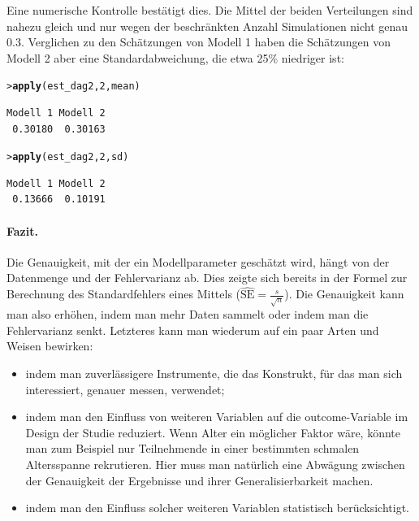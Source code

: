 \documentclass[oneside, 10pt]{book}\usepackage[]{graphicx}\usepackage[]{xcolor}
\makeatletter
\newcommand{\hlnum}[1]{\textcolor[rgb]{0.686,0.059,0.569}{#1}}%
\newcommand{\hlstd}[1]{\textcolor[rgb]{0.345,0.345,0.345}{#1}}%
\newcommand{\hlkwd}[1]{\textcolor[rgb]{0.737,0.353,0.396}{\textbf{#1}}}%
\newenvironment{kframe}{%
 \def\at@end@of@kframe{}%
 \ifinner\ifhmode%
  \def\at@end@of@kframe{\end{minipage}}%
  \begin{minipage}{\columnwidth}%
 \fi\fi%
 \def\FrameCommand##1{\hskip\@totalleftmargin \hskip-\fboxsep
 \colorbox{shadecolor}{##1}\hskip-\fboxsep
     \hskip-\linewidth \hskip-\@totalleftmargin \hskip\columnwidth}%
 \MakeFramed {\advance\hsize-\width
   \@totalleftmargin\z@ \linewidth\hsize
   \@setminipage}}%
 {\par\unskip\endMakeFramed%
 \at@end@of@kframe}
\newenvironment{knitrout}{}{} %
\makeatother
\begin{document}
Eine numerische Kontrolle bestätigt dies. Die Mittel der beiden
Verteilungen sind nahezu gleich und nur wegen der beschränkten Anzahl
Simulationen nicht genau 0.3. Verglichen zu den Schätzungen von Modell 1
haben die Schätzungen von Modell 2 aber eine Standardabweichung, die etwa
25\% niedriger ist:
\begin{knitrout}
\color{fgcolor}\begin{kframe}
\begin{alltt}
\hlstd{> }\hlkwd{apply}\hlstd{(est_dag2,} \hlnum{2}\hlstd{, mean)}
\end{alltt}
\begin{verbatim}
Modell 1 Modell 2 
 0.30180  0.30163 
\end{verbatim}
\begin{alltt}
\hlstd{> }\hlkwd{apply}\hlstd{(est_dag2,} \hlnum{2}\hlstd{, sd)}
\end{alltt}
\begin{verbatim}
Modell 1 Modell 2 
 0.13666  0.10191 
\end{verbatim}
\end{kframe}
\end{knitrout}

\paragraph{Fazit.}
Die Genauigkeit, mit der ein Modellparameter geschätzt
wird, hängt von der Datenmenge und der Fehlervarianz ab.
Dies zeigte sich bereits in der Formel zur Berechnung
des Standardfehlers eines Mittels
($\widehat{\textrm{SE}} = \frac{s}{\sqrt{n}}$).
Die Genauigkeit kann man also erhöhen, indem man
mehr Daten sammelt oder indem man die Fehlervarianz senkt.
Letzteres kann man wiederum auf ein paar Arten und Weisen bewirken:
\begin{itemize}
 \item indem man zuverlässigere Instrumente, die das Konstrukt, für das
 man sich interessiert, genauer messen, verwendet;

 \item indem man den Einfluss von weiteren Variablen auf die outcome-Variable
 im Design der Studie reduziert. Wenn Alter ein möglicher Faktor wäre,
 könnte man zum Beispiel nur Teilnehmende in einer bestimmten
 schmalen Altersspanne rekrutieren.
 Hier muss man natürlich eine Abwägung zwischen der Genauigkeit der Ergebnisse
 und ihrer Generalisierbarkeit machen.

 \item indem man den Einfluss solcher weiteren Variablen
 statistisch berücksichtigt.
\end{itemize}
\end{document}
